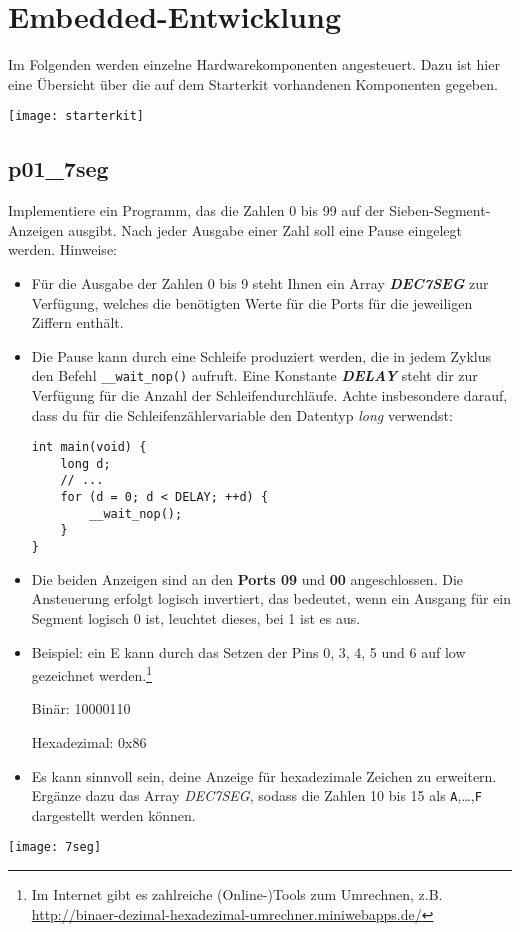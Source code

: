 \section{Embedded-Entwicklung}

Im Folgenden werden einzelne Hardwarekomponenten angesteuert. Dazu ist hier eine Übersicht über die auf dem Starterkit vorhandenen Komponenten gegeben.
\begin{center}\texttt{[image: starterkit]}\end{center}

\subsection{p01\_7seg}
\label{exercise7Segment}

Implementiere ein Programm, das die Zahlen 0 bis 99 auf der Sieben-Segment-Anzeigen ausgibt.
Nach jeder Ausgabe einer Zahl soll eine Pause eingelegt werden.
Hinweise:\begin{itemize}
\item 
Für die Ausgabe der Zahlen 0 bis 9 steht Ihnen ein Array \textbf{\emph{DEC7SEG}} zur Verfügung, welches die benötigten Werte für die Ports für die jeweiligen Ziffern enthält.

\item 
Die Pause kann durch eine Schleife produziert werden, die in jedem Zyklus den Befehl \texttt{\_\_wait\_nop()} aufruft.
Eine Konstante \textbf{\emph{DELAY}} steht dir zur Verfügung für die Anzahl der Schleifendurchläufe.
Achte insbesondere darauf, dass du für die Schleifenzählervariable den Datentyp \emph{long} verwendst:
\begin{lstlisting}
int main(void) {
    long d;
    // ...
    for (d = 0; d < DELAY; ++d) {
        __wait_nop();
    }
}
\end{lstlisting}

\item
Die beiden Anzeigen sind an den \textbf{Ports 09} und \textbf{00} angeschlossen.
Die Ansteuerung erfolgt logisch invertiert, das bedeutet, wenn ein Ausgang für ein Segment logisch 0 ist, leuchtet dieses, bei 1 ist es aus.

\item
Beispiel: ein \glqq{}E\grqq{} kann durch das Setzen der Pins 0, 3, 4, 5 und 6 auf low gezeichnet werden.\footnote{
	Im Internet gibt es zahlreiche (Online-)Tools zum Umrechnen, z.B. 
	\url{http://binaer-dezimal-hexadezimal-umrechner.miniwebapps.de/}
}

\quad Binär: 10000110

\quad Hexadezimal: 0x86

\item
Es kann sinnvoll sein, deine Anzeige für hexadezimale Zeichen zu erweitern.
Ergänze dazu das Array \emph{DEC7SEG}, sodass die Zahlen 10 bis 15 als \texttt{A},\dots,\texttt{F} dargestellt werden können.

\end{itemize}
\begin{center}\texttt{[image: 7seg]}\end{center}


